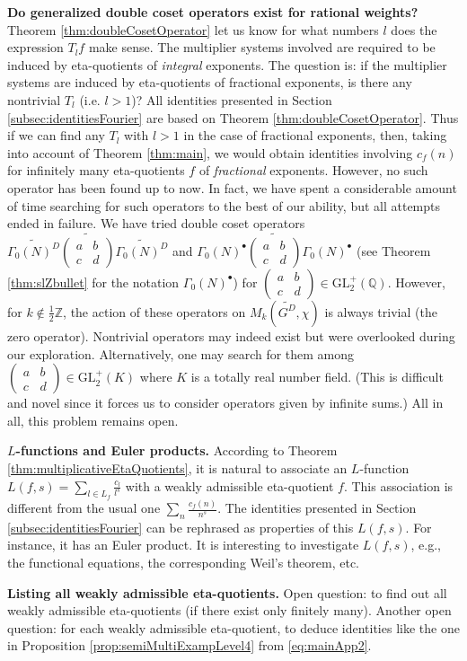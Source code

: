\documentclass[12pt]{amsart}
\numberwithin{equation}{section}
\theoremstyle{plain}
\theoremstyle{definition}
\theoremstyle{remark}
\newcommand\tbtmat[4]{\left(\begin{smallmatrix}{#1} & {#2} \\ {#3} & {#4}\end{smallmatrix}\right)}
\newcommand\numZ{\mathbb{Z}}
\newcommand\glpQ{\mathrm{GL}_2^{+}(\mathbb{Q})}
\newcommand\Dcover[2]{\widetilde{#1^{#2}}}
\begin{document}
\textbf{Do generalized double coset operators exist for rational weights?} Theorem \ref{thm:doubleCosetOperator} let us know for what numbers $l$ does the expression $T_lf$ make sense. The multiplier systems involved are required to be induced by eta-quotients of \emph{integral} exponents. The question is: if the multiplier systems are induced by eta-quotients of fractional exponents, is there any nontrivial $T_l$ (i.e. $l>1$)? All identities presented in Section \ref{subsec:identitiesFourier} are based on Theorem \ref{thm:doubleCosetOperator}. Thus if we can find any $T_l$ with $l>1$ in the case of fractional exponents, then, taking into account of Theorem \ref{thm:main}, we would obtain identities involving $c_f(n)$ for infinitely many eta-quotients $f$ of \emph{fractional} exponents. However, no such operator has been found up to now. In fact, we have spent a considerable amount of time searching for such operators to the best of our ability, but all attempts ended in failure. We have tried double coset operators $\Dcover{\Gamma_0(N)}{D}\widetilde{\tbtmat{a}{b}{c}{d}}\Dcover{\Gamma_0(N)}{D}$ and $\Gamma_0(N)^\bullet\widetilde{\tbtmat{a}{b}{c}{d}}\Gamma_0(N)^\bullet$ (see Theorem \ref{thm:slZbullet} for the notation $\Gamma_0(N)^\bullet$) for $\tbtmat{a}{b}{c}{d}\in\glpQ$. However, for $k\not\in\frac{1}{2}\numZ$, the action of these operators on $M_k(\Dcover{G}{D},\chi)$ is always trivial (the zero operator). Nontrivial operators may indeed exist but were overlooked during our exploration. Alternatively, one may search for them among $\tbtmat{a}{b}{c}{d}\in\mathrm{GL}_2^{+}(K)$ where $K$ is a  totally real number field. (This is difficult and novel since it forces us to consider operators given by infinite sums.) All in all, this problem remains open.

\textbf{$L$-functions and Euler products.} According to Theorem \ref{thm:multiplicativeEtaQuotients}, it is natural to associate an $L$-function $L(f,s)=\sum_{l\in L_f}\frac{c_l}{l^s}$ with a weakly admissible eta-quotient $f$. This association is different from the usual one $\sum_{n}\frac{c_f(n)}{n^s}$. The identities presented in Section \ref{subsec:identitiesFourier} can be rephrased as properties of this $L(f,s)$. For instance, it has an Euler product. It is interesting to investigate $L(f,s)$, e.g., the functional equations, the corresponding Weil's theorem, etc.

\textbf{Listing all weakly admissible eta-quotients.} Open question: to find out all weakly admissible eta-quotients (if there exist only finitely many). Another open question: for each weakly admissible eta-quotient, to deduce identities like the one in Proposition \ref{prop:semiMultiExampLevel4} from \eqref{eq:mainApp2}.
\end{document}
